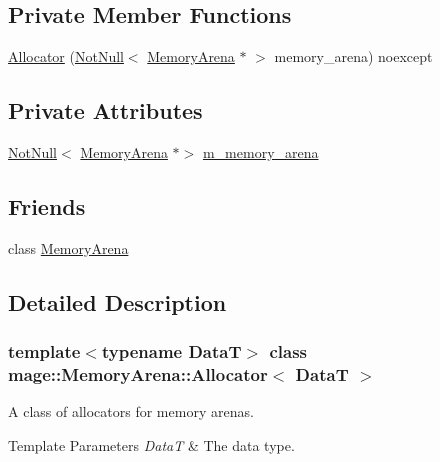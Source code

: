 \subsection*{Private Member Functions}
\begin{DoxyCompactItemize}
\item 
\hyperlink{classmage_1_1_memory_arena_1_1_allocator_a0e4b65dba593a1fc8b77e7f2c4ad9659}{Allocator} (\hyperlink{namespacemage_a8769f9d670d6b585ea306cb1062af94b}{Not\+Null}$<$ \hyperlink{classmage_1_1_memory_arena}{Memory\+Arena} $\ast$ $>$ memory\+\_\+arena) noexcept
\end{DoxyCompactItemize}
\subsection*{Private Attributes}
\begin{DoxyCompactItemize}
\item 
\hyperlink{namespacemage_a8769f9d670d6b585ea306cb1062af94b}{Not\+Null}$<$ \hyperlink{classmage_1_1_memory_arena}{Memory\+Arena} $\ast$$>$ \hyperlink{classmage_1_1_memory_arena_1_1_allocator_af2f11f067fc3af6ebf94c24ce89e9258}{m\+\_\+memory\+\_\+arena}
\end{DoxyCompactItemize}
\subsection*{Friends}
\begin{DoxyCompactItemize}
\item 
class \hyperlink{classmage_1_1_memory_arena_1_1_allocator_a934e79307a45b6e72da26d1f10079550}{Memory\+Arena}
\end{DoxyCompactItemize}


\subsection{Detailed Description}
\subsubsection*{template$<$typename DataT$>$\newline
class mage\+::\+Memory\+Arena\+::\+Allocator$<$ Data\+T $>$}

A class of allocators for memory arenas.


\begin{DoxyTemplParams}{Template Parameters}
{\em DataT} & The data type. \\
\hline
\end{DoxyTemplParams}


